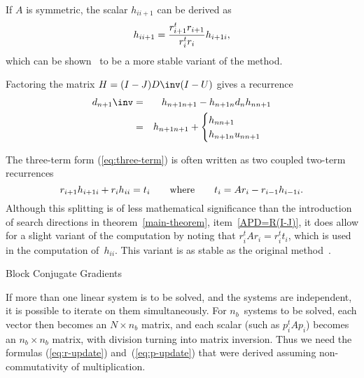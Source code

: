 \documentclass[11pt]{artikel3}
\begin{document}
\begin{Outline}
If $A$ is symmetric, the scalar $h_{ii+1}$ can be derived as
\begin{equation}
        h_{ii+1}={r_{i+1}^tr_{i+1}\over r_i^tr_i}h_{i+1i},
        \label{h:both:sides}\end{equation}
which can be shown~\cite{Pa:variantslanczos,Pa:errorlanczos}
to be a more stable variant
of the method.

Factoring the matrix $H=(I-J)D\inv(I-U)$ gives a recurrence
\begin{eqnarray*}
  d_{n+1}\inv&=&h_{n+1n+1}-h_{n+1n}d_nh_{nn+1}\\
    &=&h_{n+1n+1}+\begin{cases}h_{nn+1}\cr h_{n+1n}u_{nn+1}\end{cases}
\end{eqnarray*}

The three-term form (\ref{eq:three-term}) is often written as two
coupled two-term recurrences
\[ r_{i+1}h_{i+1i} + r_ih_{ii} = t_i
        \qquad\hbox{where}\qquad
        t_i = Ar_i - r_{i-1}h_{i-1i}. \]
Although this splitting is of less mathematical significance than the
introduction of search directions in
theorem~\ref{main-theorem}, item~\ref{APD=R(I-J)},
it does
allow for a slight variant of the computation by noting that
$r_i^tAr_i=r_i^tt_i$, which is used in the computation of~$h_{ii}$.
This variant is as stable as the original
method~\cite{Pa:variantslanczos}.

\begin{comment}
\Level 1 {Orthomin and Orthodir}

A popular conjugate gradient method for nonsymmetric systems is
`Orthomin', originally presented by~\cite{Vi:orthomin} (see
also~\cite{YoJe:generalizedcg}). It 
corresponds to orthogonalizing the residuals with respect to some
auxiliary matrix~$Z$; see section~\ref{sec:cg:inprod}. For the
formulas for~$d_{nn}$ and $u_{n-k,n}$ we find
\[ d_{nn}={r_n^tZAr_n\over p_n^tZAp_n}={p_n^tZAr_n\over p_n^tZAp_n} \]
and for~$k<n$
\[ u_{k,n} = -{p_k^tZAr_n+\sum_{i=1}^{k-1}p_k^tZAp_iu_{i,n}
        \over p_k^tZAp_n}
        \]
which can be derived from equation~(\ref{orthomin:recurrence}).
\end{comment}

 {Block Conjugate Gradients}
\label{sec:block}

If more than one linear system is to be solved, and the systems are
independent, it is possible to iterate on them simultaneously.
For $n_b$~systems to be solved, each vector then becomes an
$N\times n_b$ matrix, and each scalar (such as $p_i^tAp_i$) becomes
an $n_b\times n_b$ matrix, with division turning into matrix inversion.
Thus we need the formulas (\ref{eq:r-update}) and~(\ref{eq:p-update})
that were derived assuming non-commutativity of multiplication.


\end{Outline}
\end{document}
